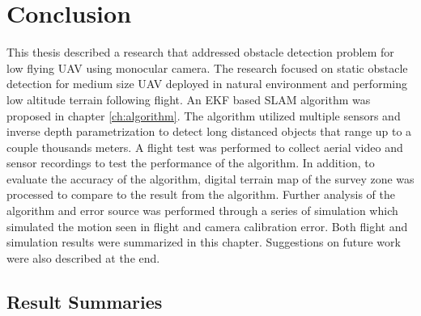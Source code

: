 \chapter{Conclusion}\label{ch:conclusion}
This thesis described a research that addressed obstacle detection
problem for low flying UAV using monocular camera. The research
focused on static obstacle detection for medium size UAV deployed in
natural environment and performing low altitude terrain following
flight. An EKF based SLAM algorithm was proposed in chapter
\ref{ch:algorithm}. The algorithm utilized multiple sensors and
inverse depth parametrization to detect long distanced objects that
range up to a couple thousands meters. A flight test was performed to
collect aerial video and sensor recordings to test the performance of
the algorithm. In addition, to evaluate the accuracy of the algorithm,
digital terrain map of the survey zone was processed to compare to the
result from the algorithm. Further analysis of the algorithm and error
source was performed through a series of simulation which simulated the
motion seen in flight and camera calibration error. Both flight and
simulation results were summarized in this chapter. Suggestions on
future work were also described at the end. 

\section{Result Summaries}

